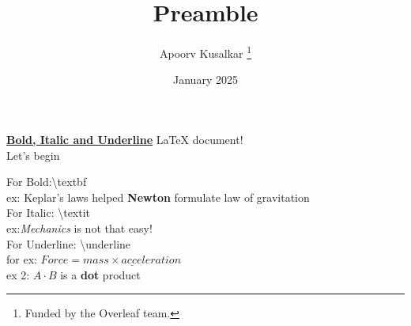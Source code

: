 \documentclass[12pt, letterpaper]{article}
\title{Preamble}
\author{Apoorv Kusalkar \thanks{Funded by the Overleaf team.}}
\date{January 2025}
\begin{document}
\maketitle
\textbf{\underline{Bold, Italic and Underline}}
\LaTeX{} document!\\

Let's begin

\par  For Bold:\textbackslash textbf{}\\ 
ex: Keplar's laws helped \textbf{Newton} formulate law of gravitation \\

For Italic: \textbackslash textit{}\\
ex:\textit{Mechanics} is not that easy!\\

For Underline: \textbackslash underline{} \\
for ex: $Force = \underline{mass \times acceleration}$
\\
ex 2: $A \cdot B$ is a \textbf{dot} product
\end{document}
